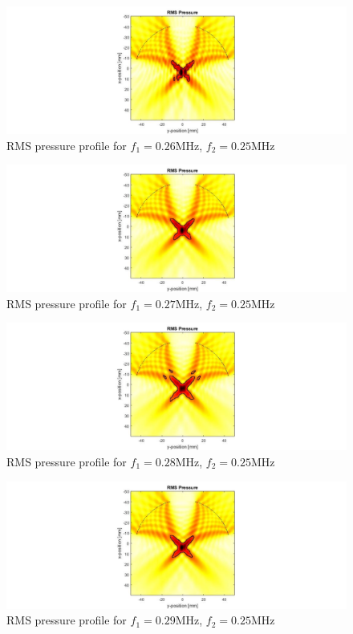 \documentclass[10pt,a4paper]{article}
\begin{document}
\begin{figure}[!h]\label{f260kHz}
\hspace*{-5cm}                                                    
\includegraphics[scale=0.6]{f260kHz}
\caption{RMS pressure profile for $f_1 = 0.26$MHz, $f_2 = 0.25$MHz}
\end{figure}
\begin{figure}[!h]\label{f270kHz}
\hspace*{-5cm}                                                    
\includegraphics[scale=0.6]{f270kHz}
\caption{RMS pressure profile for $f_1 = 0.27$MHz, $f_2 = 0.25$MHz}
\end{figure}
\begin{figure}[!h]\label{f280kHz}
\hspace*{-5cm}                                                    
\includegraphics[scale=0.6]{f280kHz}
\caption{RMS pressure profile for $f_1 = 0.28$MHz, $f_2 = 0.25$MHz}
\end{figure}
\begin{figure}[!h]\label{f290kHz}
\hspace*{-5cm}                                                    
\includegraphics[scale=0.6]{f290kHz}
\caption{RMS pressure profile for $f_1 = 0.29$MHz, $f_2 = 0.25$MHz}
\end{figure}
\end{document}
